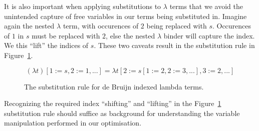 It is also important when applying substitutions to $\lambda$ terms that we avoid the unintended capture of free variables in our terms being substituted in. Imagine again the nested $\lambda$ term, with occurences of $2$ being replaced with $s$. Occurences of $1$ in $s$ must be replaced with $2$, else the nested $\lambda$ binder will capture the index. We this ``lift'' the indices of $s$. These two caveats result in the substitution rule in Figure~\ref{eq:debruijn_sub}.\cite{abadi1991}

\begin{figure}
\begin{equation*}
(\lambda t)[1 := s, 2 := 1, ...] = \lambda t[2 := s[1 := 2, 2 := 3, ...], 3 := 2, ...]
\end{equation*}
\caption{The substitution rule for de Bruijn indexed lambda terms.}
\label{eq:debruijn_sub}
\end{figure}

Recognizing the required index ``shifting'' and ``lifting'' in the Figure~\ref{eq:debruijn_sub} substitution rule should suffice as background for understanding the variable manipulation performed in our optimisation.


